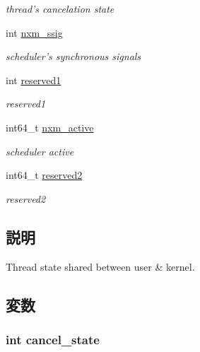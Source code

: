 \begin{DoxyCompactItemize}
\begin{DoxyCompactList}\small\item\em thread's cancelation state \item\end{DoxyCompactList}\item 
int \hyperlink{structTru64_1_1ushared__state_ab1f77590928da984017362cd8114956a}{nxm\_\-ssig}
\begin{DoxyCompactList}\small\item\em scheduler's synchronous signals \item\end{DoxyCompactList}\item 
int \hyperlink{structTru64_1_1ushared__state_a18a373c8b2126ea9409c08cede8f7326}{reserved1}
\begin{DoxyCompactList}\small\item\em reserved1 \item\end{DoxyCompactList}\item 
int64\_\-t \hyperlink{structTru64_1_1ushared__state_a1d8e8613bfc82fdd41b1a9cecff3a8c8}{nxm\_\-active}
\begin{DoxyCompactList}\small\item\em scheduler active \item\end{DoxyCompactList}\item 
int64\_\-t \hyperlink{structTru64_1_1ushared__state_ac962a352ad5618348c3871ef54b4d2ee}{reserved2}
\begin{DoxyCompactList}\small\item\em reserved2 \item\end{DoxyCompactList}\end{DoxyCompactItemize}


\subsection{説明}
Thread state shared between user \& kernel. 

\subsection{変数}
\hypertarget{structTru64_1_1ushared__state_aabbd9f971cb4aa1bd714e3f22cd35654}{
\subsubsection[{cancel\_\-state}]{\setlength{\rightskip}{0pt plus 5cm}int {\bf cancel\_\-state}}}
\label{structTru64_1_1ushared__state_aabbd9f971cb4aa1bd714e3f22cd35654}


